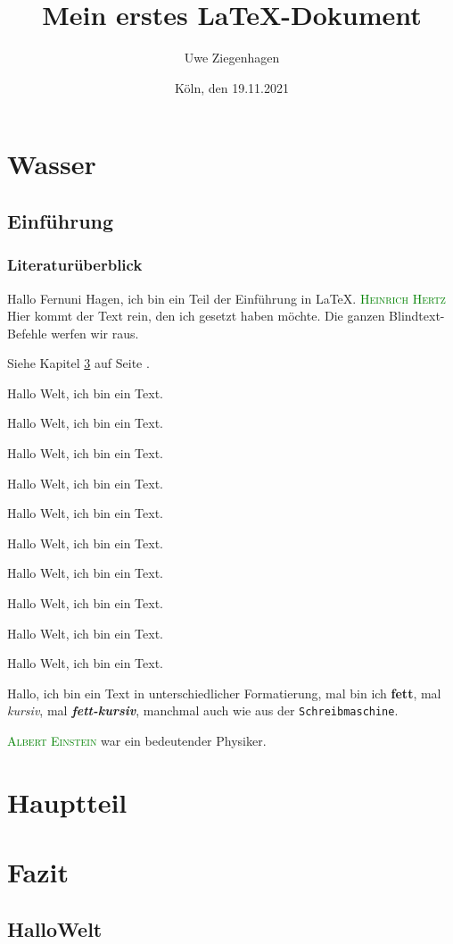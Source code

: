 \documentclass[12pt,ngerman,parskip=full]{scrreprt}
\author{Uwe Ziegenhagen}
\title{Mein erstes \LaTeX-Dokument}
\date{Köln, den 19.11.2021}
\newcommand{\person}[1]{\textsc{\textcolor{green}{#1}}}
\begin{document}
\maketitle

\tableofcontents

\chapter{Wasser}

\section{Einführung}
\subsection{Literaturüberblick}

Hallo Fernuni Hagen, ich bin ein Teil der Einführung in \LaTeX. \person{Heinrich Hertz}
Hier kommt der Text rein, den ich gesetzt haben möchte. 
Die ganzen Blindtext-Befehle werfen wir raus.

Siehe Kapitel \ref{cha:fazit} auf Seite \pageref{cha:fazit}.

{\tiny Hallo Welt, ich bin ein Text.}

{\scriptsize Hallo Welt, ich bin ein Text.}

{\footnotesize Hallo Welt, ich bin ein Text.}

{\small Hallo Welt, ich bin ein Text.}

{\normalsize Hallo Welt, ich bin ein Text.}

{\large Hallo Welt, ich bin ein Text.}

{\Large Hallo Welt, ich bin ein Text.}

{\LARGE Hallo Welt, ich bin ein Text.}

{\huge Hallo Welt, ich bin ein Text.}

{\Huge Hallo Welt, ich bin ein Text.}

Hallo, ich bin ein Text in unterschiedlicher Formatierung, mal bin ich \textbf{fett}, mal \textit{kursiv}, mal \textbf{\textit{fett-kursiv}}, manchmal auch wie aus der \texttt{Schreibmaschine}. 

\person{Albert Einstein} war ein bedeutender Physiker.

\chapter{Hauptteil}\label{cha:hauptteil}

\blindtext[200]  

\blindtext[200]  

\blindtext[200]  

\chapter{Fazit}\label{cha:fazit}

\section{HalloWelt}\label{sec:hallo}

\blindtext[2]  

\blindtext[2]  

\blindtext[2]  
\end{document}
